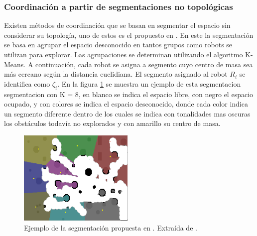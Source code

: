 
\subsubsection{Coordinación a partir de segmentaciones no topológicas}\label{subsec:coordNoTop}
Existen métodos de coordinación que se basan en segmentar el espacio sin considerar su topología, uno de estos es el propuesto en \cite{Solanas2004}. En este la segmentación se basa en agrupar el espacio desconocido en tantos grupos como robots se utilizan para explorar. Las agrupaciones se determinan utilizando el algoritmo K-Means\cite{hartigan1979ak}. A continuación, cada robot se asigna a segmento cuyo centro de masa sea más cercano según la distancia euclidiana. El segmento asignado al robot $R_i$ se identifica como $\zeta_i$. En la figura \ref{fig:ejemploCoodGrill} se muestra un ejemplo de esta segmentacion segmentacion con K = 8, en blanco se indica el espacio libre, con negro el espacio ocupado, y con colores se indica el espacio desconocido, donde cada color indica un segmento diferente dentro de los cuales se indica con tonalidades mas oscuras los obstáculos todavía no explorados y con amarillo su centro de masa.
\begin{figure}[H]
  \center
  \includegraphics[width=5.5cm]{imagenes/coordGrillCM.png}
  \caption{Ejemplo de la segmentación propuesta en \cite{Solanas2004}. Extraída de \cite{wu2007voronoi}.}\label{fig:ejemploCoodGrill}
\end{figure} 

